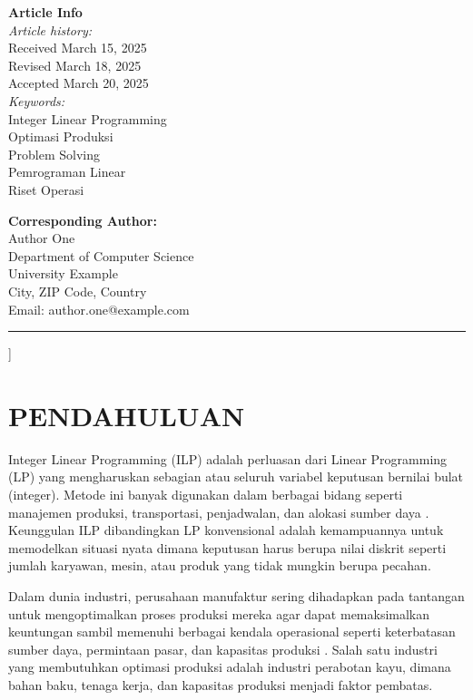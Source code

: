 \documentclass[twocolumn]{article}
\begin{document}
\begin{@twocolumnfalse}
    \begin{minipage}{0.48\textwidth}
      \textbf{Article Info} \\
      \smallskip
      \textit{Article history:} \\
      Received March 15, 2025 \\
      Revised March 18, 2025 \\
      Accepted March 20, 2025 \\
      \vspace{1em}
      \textit{Keywords:} \\
      Integer Linear Programming \\
      Optimasi Produksi \\
      Problem Solving \\
      Pemrograman Linear \\
      Riset Operasi
    \end{minipage}
    \hfill
    \begin{minipage}{0.48\textwidth}
      \textbf{Corresponding Author:} \\
      \smallskip
      Author One \\
      Department of Computer Science \\
      University Example \\
      City, ZIP Code, Country \\
      Email: author.one@example.com
    \end{minipage}
    
    \vspace{1em}
    \noindent\rule{\textwidth}{0.4pt}
    \vspace{1em}
  \end{@twocolumnfalse}
]

\section{PENDAHULUAN}
Integer Linear Programming (ILP) adalah perluasan dari Linear Programming (LP) yang mengharuskan sebagian atau seluruh variabel keputusan bernilai bulat (integer). Metode ini banyak digunakan dalam berbagai bidang seperti manajemen produksi, transportasi, penjadwalan, dan alokasi sumber daya \cite{taha2017operations}. Keunggulan ILP dibandingkan LP konvensional adalah kemampuannya untuk memodelkan situasi nyata dimana keputusan harus berupa nilai diskrit seperti jumlah karyawan, mesin, atau produk yang tidak mungkin berupa pecahan.

Dalam dunia industri, perusahaan manufaktur sering dihadapkan pada tantangan untuk mengoptimalkan proses produksi mereka agar dapat memaksimalkan keuntungan sambil memenuhi berbagai kendala operasional seperti keterbatasan sumber daya, permintaan pasar, dan kapasitas produksi \cite{winston2004operations}. Salah satu industri yang membutuhkan optimasi produksi adalah industri perabotan kayu, dimana bahan baku, tenaga kerja, dan kapasitas produksi menjadi faktor pembatas.
\end{document}
